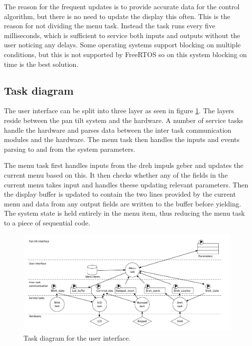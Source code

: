 The reason for the frequent updates is to provide accurate data for the control algorithm, but there is no need to update the display this often. This is the reason for not dividing the menu task. Instead the task runs every five milliseconds, which is sufficient to service both inputs and outputs without the user noticing any delays. Some operating systems support blocking on multiple conditions, but this is not supported by FreeRTOS so on this system blocking on time is the best solution.

\subsection{Task diagram}
The user interface can be split into three layer as seen in figure \ref{fig:ui_task_diagram}. The layers reside between the pan tilt system and the hardware. A number of service tasks handle the hardware and parses data between the inter task communication modules and the hardware. The menu task then handles the inputs and events parsing to and from the system parameters.

The menu task first handles inputs from the dreh impuls geber and updates the current menu based on this. It then checks whether any of the fields in the current menu takes input and handles theese updating relevant parameters. Then the display buffer is updated to contain the two lines provided by the current menu and data from any output fields are written to the buffer before yielding. The system state is held entirely in the menu item, thus reducing the menu task to a piece of sequential code.

\begin{figure}[htb]
	\centering
	\includegraphics[width=\textwidth,trim=0 0 0 0]{graphics/task_diagram_user_interface.pdf} 
	\caption{Task diagram for the user interface.}
	\label{fig:ui_task_diagram}
\end{figure}

